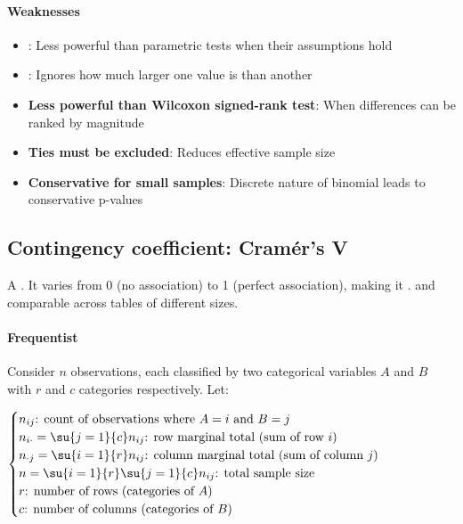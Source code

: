 \paragraph{Weaknesses}
\begin{itemize}
    \item {}: Less powerful than parametric tests when their assumptions hold
    \item {}: Ignores how much larger one value is than another
    \item \textbf{Less powerful than Wilcoxon signed-rank test}: When differences can be ranked by magnitude
    \item \textbf{Ties must be excluded}: Reduces effective sample size
    \item \textbf{Conservative for small samples}: Discrete nature of binomial leads to conservative p-values
\end{itemize}



\subsection{Contingency coefficient: Cramér's V}
A . It varies from 0 (no association) to 1 (perfect association), making it
.  and comparable across tables of different sizes.

\paragraph{Frequentist}
Consider $n$ observations, each classified by two categorical variables $A$ and $B$ with
$r$ and $c$ categories respectively. Let:

$\begin{cases}
    n_{ij}\text{: count of observations where } A = i \text{ and } B = j \\
    n_{i\cdot} = \su{j=1}{c}n_{ij}\text{: row marginal total (sum of row } i\text{)} \\
    n_{\cdot j} = \su{i=1}{r}n_{ij}\text{: column marginal total (sum of column } j\text{)} \\
    n = \su{i=1}{r}\su{j=1}{c}n_{ij}\text{: total sample size} \\
    r\text{: number of rows (categories of } A\text{)} \\
    c\text{: number of columns (categories of } B\text{)}
\end{cases}$

